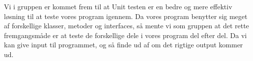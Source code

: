 \vspace {5mm}

Vi i gruppen er kommet frem til at Unit testen er en bedre og mere effektiv løsning til at teste vores program igennem. Da vores program benytter sig meget af forskellige klasser, metoder og interfaces, så mente vi som gruppen at det rette fremgangsmåde er at teste de forskellige dele i vores program del efter del. Da vi kan give input til programmet, og så finde ud af om det rigtige output kommer ud. 



